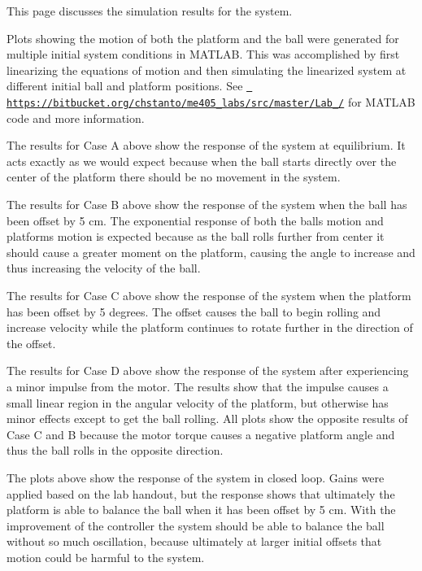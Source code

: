 This page discusses the simulation results for the system.

Plots showing the motion of both the platform and the ball were generated for multiple initial system conditions in M\+A\+T\+L\+AB. This was accomplished by first linearizing the equations of motion and then simulating the linearized system at different initial ball and platform positions. See \href{https://bitbucket.org/chstanto/me405_labs/src/master/Lab_6/}{\texttt{ https\+://bitbucket.\+org/chstanto/me405\+\_\+labs/src/master/\+Lab\+\_/}} for M\+A\+T\+L\+AB code and more information.



The results for Case A above show the response of the system at equilibrium. It acts exactly as we would expect because when the ball starts directly over the center of the platform there should be no movement in the system.



The results for Case B above show the response of the system when the ball has been offset by 5 cm. The exponential response of both the balls motion and platforms motion is expected because as the ball rolls further from center it should cause a greater moment on the platform, causing the angle to increase and thus increasing the velocity of the ball.



The results for Case C above show the response of the system when the platform has been offset by 5 degrees. The offset causes the ball to begin rolling and increase velocity while the platform continues to rotate further in the direction of the offset.



The results for Case D above show the response of the system after experiencing a minor impulse from the motor. The results show that the impulse causes a small linear region in the angular velocity of the platform, but otherwise has minor effects except to get the ball rolling. All plots show the opposite results of Case C and B because the motor torque causes a negative platform angle and thus the ball rolls in the opposite direction.



The plots above show the response of the system in closed loop. Gains were applied based on the lab handout, but the response shows that ultimately the platform is able to balance the ball when it has been offset by 5 cm. With the improvement of the controller the system should be able to balance the ball without so much oscillation, because ultimately at larger initial offsets that motion could be harmful to the system. 